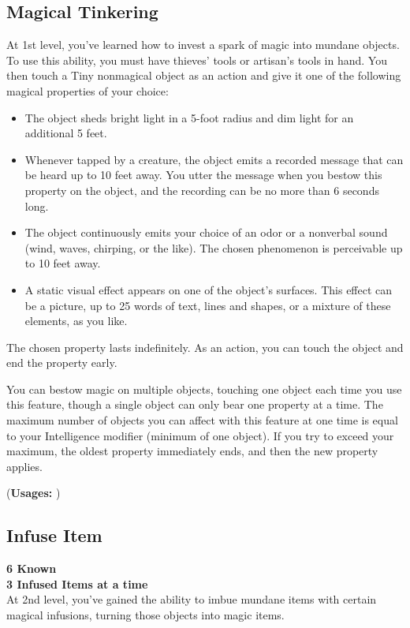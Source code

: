 {\subsection*{Magical Tinkering}
At 1st level, you've learned how to invest a spark of magic into mundane objects. To use this ability, you must have thieves' tools or artisan's tools in hand. You then touch a Tiny nonmagical object as an action and give it one of the following magical properties of your choice:
\begin{itemize}
	\item The object sheds bright light in a 5-foot radius and dim light for an additional 5 feet.
	\item Whenever tapped by a creature, the object emits a recorded message that can be heard up to 10 feet away. You utter the message when you bestow this property on the object, and the recording can be no more than 6 seconds long.
	\item The object continuously emits your choice of an odor or a nonverbal sound (wind, waves, chirping, or the like). The chosen phenomenon is perceivable up to 10 feet away.
	\item A static visual effect appears on one of the object's surfaces. This effect can be a picture, up to 25 words of text, lines and shapes, or a mixture of these elements, as you like.
\end{itemize}
The chosen property lasts indefinitely. As an action, you can touch the object and end the property early.

You can bestow magic on multiple objects, touching one object each time you use this feature, though a single object can only bear one property at a time. The maximum number of objects you can affect with this feature at one time is equal to your Intelligence modifier (minimum of one object). If you try to exceed your maximum, the oldest property immediately ends, and then the new property applies.

(\textbf{Usages: })
\subsection*{Infuse Item}
\textbf{6 Known}\\
\textbf{3 Infused Items at a time}\\
At 2nd level, you've gained the ability to imbue mundane items with certain magical infusions, turning those objects into magic items.

}
